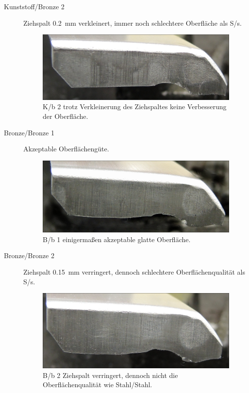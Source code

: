 \documentclass[12pt,a4paper,parskip,twoside,BCOR5mm,headsepline]{scrartcl}
\begin{document}
\begin{description*}
\begin{description}
\item[Kunststoff/Bronze 2] Ziehspalt \SI{0.2}{\milli\meter} verkleinert, immer noch schlechtere Oberfläche als S/s.
\begin{figure}[H]
\centering
\includegraphics[width=.8\textwidth]{Kb2}
\caption{K/b 2 trotz Verkleinerung des Ziehspaltes keine Verbesserung der Oberfläche.}
\label{fig:Kb2}
\end{figure}
\newpage

\item[Bronze/Bronze 1] Akzeptable Oberflächengüte.
\begin{figure}[H]
\centering
\includegraphics[width=.8\textwidth]{Bb1}
\caption{B/b 1 einigermaßen akzeptable glatte Oberfläche.}
\label{fig:Bb1}
\end{figure}

\item[Bronze/Bronze 2] Ziehspalt \SI{0.15}{\milli\meter} verringert,  dennoch schlechtere Oberflächenqualität als S/s.
\begin{figure}[H]
\centering
\includegraphics[width=.8\textwidth]{Bb2}
\caption{B/b 2 Ziehspalt verringert, dennoch nicht die Oberflächenqualität wie Stahl/Stahl.}
\label{fig:Bb2}
\end{figure}
\newpage


\end{description}
\end{description*}
\end{document}
